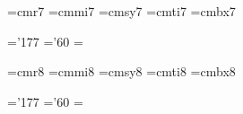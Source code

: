 
\font\viiptrm=cmr7
\font\viiptmit=cmmi7
\font\viiptsy=cmsy7
\font\viiptit=cmti7
\font\viiptbf=cmbx7

\skewchar\viiptmit='177 \skewchar\viiptsy='60
 \viiptsy=\the{} \viiptsy

\def\viipt{\ifmmode\err@badsizechange\else
     \@mathfontinit
     \textfont0=\viiptrm  \scriptfont0=\vptrm  \scriptscriptfont0=\vptrm
     \textfont1=\viiptmit \scriptfont1=\vptmit \scriptscriptfont1=\vptmit
     \textfont2=\viiptsy  \scriptfont2=\vptsy  \scriptscriptfont2=\vptsy
     \textfont3=\xptex    \scriptfont3=\xptex  \scriptscriptfont3=\xptex
     \textfont\itfam=\viiptit
     \scriptfont\itfam=\viiptit
     \scriptscriptfont\itfam=\viiptit
     \textfont\bffam=\viiptbf
     \scriptfont\bffam=\vptbf
     \scriptscriptfont\bffam=\vptbf
     \@fontstyleinit
     \def\rm{\viiptrm\fam=\z@}%
     \def\it{\viiptit\fam=\itfam}%
     \def\bf{\viiptbf\fam=\bffam}%
     \def\oldstyle{\viiptmit\fam=\@ne}%
     \rm\fi}


\font\viiiptrm=cmr8
\font\viiiptmit=cmmi8
\font\viiiptsy=cmsy8
\font\viiiptit=cmti8
\font\viiiptbf=cmbx8

\skewchar\viiiptmit='177 \skewchar\viiiptsy='60
 \viiiptsy=\the{} \viiiptsy

\def\viiipt{\ifmmode\err@badsizechange\else
     \@mathfontinit
     \textfont0=\viiiptrm  \scriptfont0=\viptrm  \scriptscriptfont0=\vptrm
     \textfont1=\viiiptmit \scriptfont1=\viptmit \scriptscriptfont1=\vptmit
     \textfont2=\viiiptsy  \scriptfont2=\viptsy  \scriptscriptfont2=\vptsy
     \textfont3=\xptex     \scriptfont3=\xptex   \scriptscriptfont3=\xptex
     \textfont\itfam=\viiiptit
     \scriptfont\itfam=\viiptit
     \scriptscriptfont\itfam=\viiptit
     \textfont\bffam=\viiiptbf
     \scriptfont\bffam=\viptbf
     \scriptscriptfont\bffam=\vptbf
     \@fontstyleinit
     \def\rm{\viiiptrm\fam=\z@}%
     \def\it{\viiiptit\fam=\itfam}%
     \def\bf{\viiiptbf\fam=\bffam}%
     \def\oldstyle{\viiiptmit\fam=\@ne}%
     \rm\fi}


\def\getixpt{%
     \font\ixptrm=cmr9
     \font\ixptmit=cmmi9
     \font\ixptsy=cmsy9
     \font\ixptit=cmti9
     \font\ixptbf=cmbx9
     \skewchar\ixptmit='177 \skewchar\ixptsy='60
     \fontdimen16 \ixptsy=\the\fontdimen17 \ixptsy}

